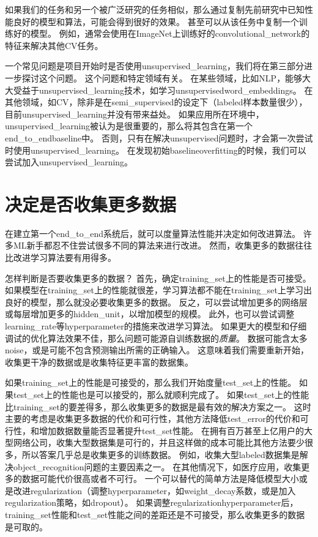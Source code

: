 如果我们的任务和另一个被广泛研究的任务相似，那么通过复制先前研究中已知性能良好的模型和算法，可能会得到很好的效果。
甚至可以从该任务中复制一个训练好的模型。
例如，通常会使用在ImageNet上训练好的\gls{convolutional_network}的特征来解决其他\gls{CV}任务\citep{girshickregion}。


一个常见问题是项目开始时是否使用\gls{unsupervised_learning}，我们将在第三部分进一步探讨这个问题。
 这个问题和特定领域有关。
在某些领域，比如\gls{NLP}，能够大大受益于\gls{unsupervised_learning}技术，如学习\gls{unsupervised}\gls{word_embeddings}。
在其他领域，如\gls{CV}，除非是在\gls{semi_supervised}的设定下（\gls{labeled}样本数量很少）\citep{Kingma-et-al-NIPS2014,Rasmus-et-al-arxiv2015}，目前\gls{unsupervised_learning}并没有带来益处。
如果应用所在环境中，\gls{unsupervised_learning}被认为是很重要的，那么将其包含在第一个\gls{end_to_end}\gls{baseline}中。
否则，只有在解决\gls{unsupervised}问题时，才会第一次尝试时使用\gls{unsupervised_learning}。
在发现初始\gls{baseline}\gls{overfitting}的时候，我们可以尝试加入\gls{unsupervised_learning}。


\section{决定是否收集更多数据}
\label{sec:determining_whether_to_gather_more_data}

在建立第一个\gls{end_to_end}系统后，就可以度量算法性能并决定如何改进算法。
许多\gls{ML}新手都忍不住尝试很多不同的算法来进行改进。
然而，收集更多的数据往往比改进学习算法要有用得多。


怎样判断是否要收集更多的数据？
首先，确定\gls{training_set}上的性能是否可接受。
如果模型在\gls{training_set}上的性能就很差，学习算法都不能在\gls{training_set}上学习出良好的模型，那么就没必要收集更多的数据。
反之，可以尝试增加更多的网络层或每层增加更多的\gls{hidden_unit}，以增加模型的规模。
此外，也可以尝试调整\gls{learning_rate}等\gls{hyperparameter}的措施来改进学习算法。
如果更大的模型和仔细调试的优化算法效果不佳，那么问题可能源自训练数据的\emph{质量}。
数据可能含太多\gls{noise}，或是可能不包含预测输出所需的正确输入。
这意味着我们需要重新开始，收集更干净的数据或是收集特征更丰富的数据集。


如果\gls{training_set}上的性能是可接受的，那么我们开始度量\gls{test_set}上的性能。
如果\gls{test_set}上的性能也是可以接受的，那么就顺利完成了。
如果\gls{test_set}上的性能比\gls{training_set}的要差得多，那么收集更多的数据是最有效的解决方案之一。
这时主要的考虑是收集更多数据的代价和可行性，其他方法降低\gls{test_error}的代价和可行性，和增加数据数量能否显著提升\gls{test_set}性能。
在拥有百万甚至上亿用户的大型网络公司，收集大型数据集是可行的，并且这样做的成本可能比其他方法要少很多，所以答案几乎总是收集更多的训练数据。
例如，收集大型\gls{labeled}数据集是解决\gls{object_recognition}问题的主要因素之一。
在其他情况下，如医疗应用，收集更多的数据可能代价很高或者不可行。
一个可以替代的简单方法是降低模型大小或是改进\gls{regularization}（调整\gls{hyperparameter}，如\gls{weight_decay}系数，或是加入\gls{regularization}策略，如\gls{dropout}）。
如果调整\gls{regularization}\gls{hyperparameter}后，\gls{training_set}性能和\gls{test_set}性能之间的差距还是不可接受，那么收集更多的数据是可取的。


